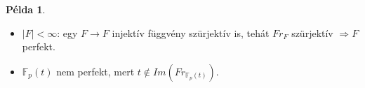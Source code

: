 \documentclass{article}
\theoremstyle{definition}
\newtheorem{pl}[tetel]{Példa}
\begin{document}
\begin{pl}
    \mbox{}
    \begin{itemize}
        \item $\lvert F \rvert < \infty$: egy $F \rightarrow F$ injektív függvény szürjektív is, tehát $Fr_F$ szürjektív $\Rightarrow F$ perfekt.
        \item $\mathbb{F}_p(t)$ nem perfekt, mert $t \notin Im(Fr_{\mathbb{F}_p(t)})$.
    \end{itemize}
\end{pl}
\end{document}
